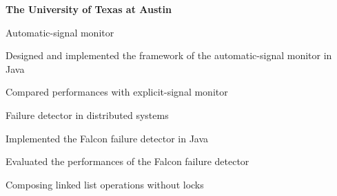 

\begin{myexp}
\item \textbf{The University of Texas at Austin}   
    \begin{myexp}
    \item Automatic-signal monitor 
        \begin{mybullet}
            \item Designed and implemented the framework of the automatic-signal
                monitor in Java
            \item Compared performances with explicit-signal monitor
        \end{mybullet}
    \item Failure detector in distributed systems  
        \begin{mybullet}
            \item Implemented the Falcon failure detector in Java
            \item Evaluated the performances of the Falcon failure detector
    \end{mybullet}
    \end{myexp}
    \begin{myexp}
    \item Composing linked list operations without locks  
        \begin{mybullet}

\end{mybullet}
\end{myexp}
\end{myexp}
